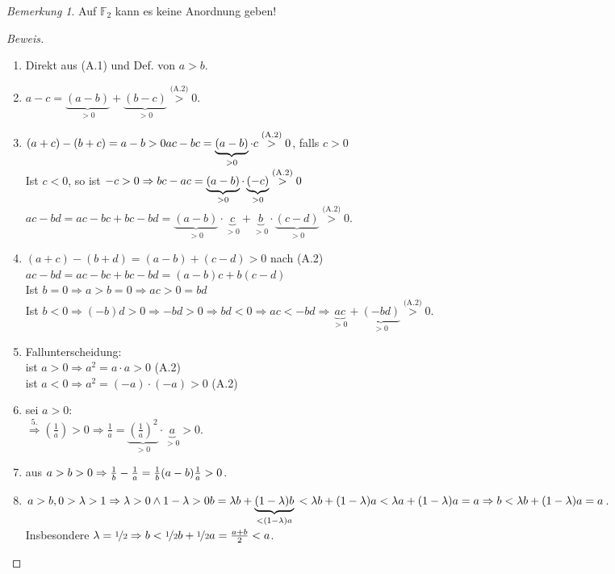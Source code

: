 \documentclass[12pt,a4paper,titlepage]{article} %
\theoremstyle{definition}
\theoremstyle{remark}
\newtheorem*{bem}{Bemerkung}
\newenvironment{bew}{\begin{proof}[Beweis]}{\end{proof}}
\begin{document}
\begin{bem}
	Auf $\mathbb{F}_2$ kann es keine Anordnung geben!
\end{bem}
\begin{bew}
	\begin{enumerate}%
		\item Direkt aus (A.1) und Def. von $a>b$.
		\item $a-c = \underbrace{(a-b)}_{>0}+\underbrace{(b-c)}_{>0} \overset{\text{(A.2)}}{>} 0$.
		\item $(a+c)-(b+c)=a-b>0\\
		ac-bc=\underbrace{(a-b)}_{>0}\cdot c \overset{\text{(A.2)}}{>}0$, falls $c>0$\\
		Ist $c<0$, so ist $-c>0\\
		\Rightarrow bc-ac=\underbrace{(a-b)}_{>0}\cdot\underbrace{(-c)}_{>0} \overset{\text{(A.2)}}{>} 0$\\
		$ac-bd=ac-bc+bc-bd=\underbrace{(a-b)}_{>0} \cdot \underbrace{c}_{>0} + \underbrace{b}_{>0} \cdot \underbrace{(c-d)}_{>0} \overset{\text{(A.2)}}{>}0$.
		\item $(a+c)-(b+d) = (a-b)+(c-d)>0$ nach (A.2)\\
		$ac-bd = ac-bc + bc-bd = (a-b)c + b(c-d)$\\
		Ist $b=0 \Rightarrow a> b = 0 \Rightarrow ac > 0 = bd$\\
		Ist $b<0 \Rightarrow (-b)d > 0 \Rightarrow -bd > 0 \Rightarrow bd < 0 \Rightarrow ac<-bd \Rightarrow \underbrace{ac}_{>0} + \underbrace{(-bd)}_{>0} \overset{\text{(A.2)}}{>} 0$.
		\item  Fallunterscheidung:\\
		ist $a>0\Rightarrow a^2 = a\cdot a > 0$ (A.2)\\
		ist $a<0\Rightarrow a^2 = (-a)\cdot(-a) > 0$ (A.2)
		\item sei $a>0:$\\
		$\overset{\text{5.}}{\Rightarrow} \left(\frac{1}{a}\right) > 0 \Rightarrow \frac{1}{a} = \underbrace{\left(\frac{1}{a}\right)^2}_{>0} \cdot \underbrace{a}_{>0} > 0$.
		\item aus $a>b>0\\
		\Rightarrow \frac{1}{b} - \frac{1}{a} = \frac{1}{b}(a-b)\frac{1}{a}>0$.
		\item $a>b, 0>\lambda>1 \Rightarrow \lambda > 0 \wedge 1-\lambda > 0\\
		b=\lambda b + \underbrace{(1-\lambda)b}_{<(1-\lambda)a}\\
		<\lambda b + (1-\lambda) a < \lambda a + (1-\lambda)a = a\\
		\Rightarrow b<\lambda b + (1-\lambda)a =a$.\\
		Insbesondere $\lambda = \nicefrac{1}{2}\Rightarrow b< \nicefrac{1}{2} b + \nicefrac{1}{2}a = \frac{a+b}{2} < a$.
	\end{enumerate}
\end{bew}
\end{document}
